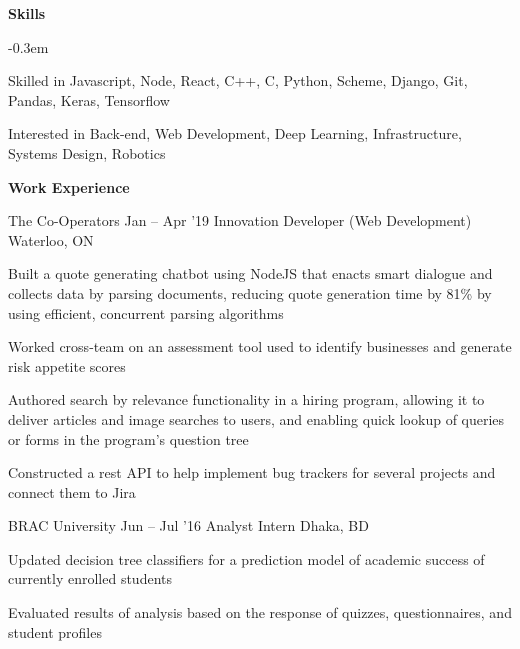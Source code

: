 \documentclass{resume} %
\begin{document}

\begin{rSection}{\textbf{Skills}}
  \vspace {0.3em}
  \begin{list}{}{\leftmargin=0.3em}
    \itemsep -0.3em \vspace{-0.3em}
    \item Skilled in Javascript, Node, React, C++, C, Python, Scheme, Django, Git, Pandas, Keras, Tensorflow
    \item Interested in Back-end, Web Development, Deep Learning, Infrastructure, Systems Design, Robotics
  \end{list}
  \vspace{0.3em}
\end{rSection}


\begin{rSection}{\textbf{Work Experience}}
  \begin{rSubsection}{The Co-Operators}
    {Jan -- Apr '19}
         {Innovation Developer (Web Development)}
         {Waterloo, ON}
       \item Built a quote generating chatbot using NodeJS that enacts smart dialogue and collects data by parsing documents, reducing quote generation time by 81\% by using efficient, concurrent parsing algorithms
       \item Worked cross{-}team on an assessment tool used to identify businesses and generate risk appetite scores
       \item Authored search by relevance functionality in a hiring program, allowing it to deliver articles and image searches to users, and enabling quick lookup of queries or forms in the program's question tree
     \item Constructed a rest API to help implement bug trackers for several projects and connect them to Jira
  \end{rSubsection}

	\begin{rSubsection}{BRAC University}
		{Jun -- Jul '16}
		{Analyst Intern}
		{Dhaka, BD}
		\item Updated decision tree classifiers for a prediction model of academic success of currently enrolled students
		\item Evaluated results of analysis based on the response of quizzes, questionnaires, and student profiles

	\end{rSubsection}
  
\end{rSection} 
\end{document}
